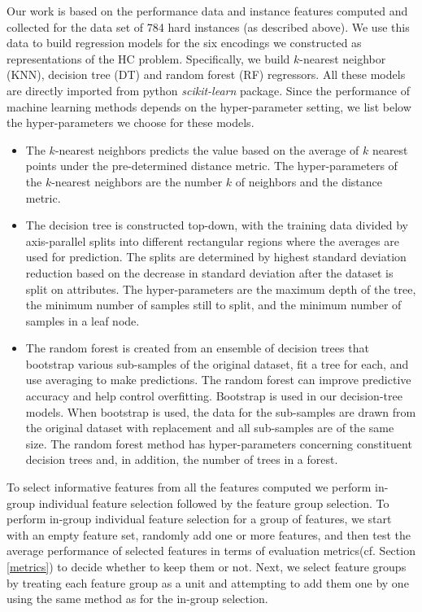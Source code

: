 \documentclass{new_tlp}
\begin{document}
Our work is based on the performance data and instance features computed and
collected for the data set of 784 hard instances (as described above). We use 
this data to build regression models for the six encodings we constructed as 
representations of the HC problem. Specifically, we build $k$-nearest neighbor
(KNN), decision tree (DT) and random forest (RF) regressors. All these models 
are directly imported from python \emph{scikit-learn} package. Since the 
performance of machine learning methods depends on the hyper-parameter setting, 
we list below the hyper-parameters we choose for these models.
\begin{itemize}
\item The $k$-nearest neighbors predicts the value based on the average of $k$
nearest points under the pre-determined distance metric. The hyper-parameters 
of the $k$-nearest neighbors are the number $k$ of neighbors and the distance
metric. 
\item The decision tree is constructed top-down, with the training data 
divided by axis-parallel splits into different rectangular regions where 
the averages are used for prediction. The splits are determined by highest 
standard deviation reduction based on the decrease in standard deviation after
the dataset is split on attributes. The hyper-parameters are the maximum depth
of the tree, the minimum number of samples still to split, and the minimum 
number of samples in a leaf node. 
\item The random forest is created from an ensemble of decision trees that 
bootstrap various sub-samples of the original dataset, fit a tree for each, 
and use averaging to make predictions. The random forest can improve predictive 
accuracy and help control overfitting. Bootstrap is used in our decision-tree models. When bootstrap is used, the data for the 
sub-samples are drawn from the original dataset with replacement and all
sub-samples are of the same size. The random forest method has hyper-parameters 
concerning constituent decision trees and, in addition, the number of trees in 
a forest. 
\end{itemize} 

To select informative features from all the features computed we perform 
in-group individual feature selection followed by the feature group 
selection. To perform in-group individual feature selection for a group
of features, we start with an empty feature set, randomly add one or more 
features, and then test the average performance of selected features in 
terms of evaluation metrics(cf. Section \ref{metrics}) to decide whether to 
keep them or not. Next, we select feature groups by treating each feature 
group as a unit and attempting to add them one by one using the same method
as for the in-group selection.
\end{document}
